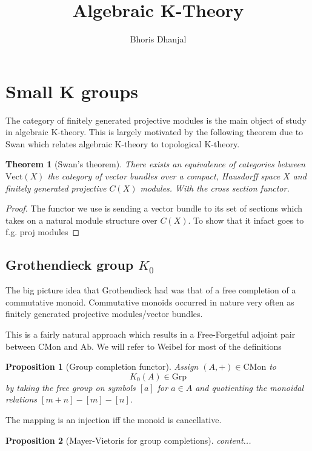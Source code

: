 \documentclass[12pt]{article}
\title{Algebraic K-Theory}
\author{Bhoris Dhanjal}
\numberwithin{equation}{section}
\newtheorem{theorem}{Theorem}[section]
\newtheorem{proposition}{Proposition}[section]
\begin{document}
	\tableofcontents
	\maketitle
	\section{Small K groups}
	The category of finitely generated projective modules is the main object of study in algebraic K-theory. This is largely motivated by the following theorem due to Swan \cite{Swan1962} which relates algebraic K-theory to topological K-theory.
	\begin{theorem}[Swan's theorem]
		There exists an equivalence of categories between $\mathrm{Vect}(X)$ the category of vector bundles over a compact, Hausdorff space $X$ and finitely generated projective $C(X)$ modules. With the cross section functor.
	\end{theorem}
	\begin{proof}
		The functor we use is sending a vector bundle to its set of sections which takes on a natural module structure over $C(X)$. To show that it infact goes to f.g. proj modules 
	\end{proof}
	
	\subsection{Grothendieck group $K_0$}
	The big picture idea that Grothendieck had was that of a free completion of a commutative monoid. Commutative monoids occurred in nature very often as finitely generated projective modules/vector bundles. 
	
	This is a fairly natural approach which results in a Free-Forgetful adjoint pair between $\mathrm{CMon}$ and $\mathrm{Ab}$. We will refer to Weibel for most of the definitions \cite{weibel2013k}
		
	\begin{proposition}[Group completion functor]
		Assign $(A,+) \in \mathrm{CMon} $ to \[K_0(A) \in \mathrm{Grp}\] by taking the free group on symbols $[a]$ for $a \in A$ and quotienting the monoidal relations $[m+n]-[m]-[n]$.
	\end{proposition}
	
	The mapping is an injection iff the monoid is cancellative.
	
	\begin{proposition}[Mayer-Vietoris for group completions]
		content...
	\end{proposition}
	
\end{document}

